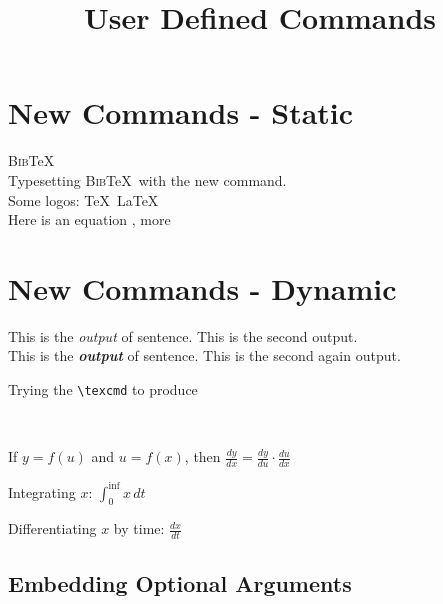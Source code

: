 \documentclass{article}
\title{\bf User Defined Commands}
\date{}
\begin{document}
	\maketitle
	
	\section{New Commands - Static} 
	\newcommand{\bibtex}{\textsc{Bib}\TeX~}
	\bibtex \\
	Typesetting \bibtex with the new command. \\
	
	\noindent
	\newcommand{\texnames}{Some logos: \TeX~\LaTeX}
	\texnames \\
	
	\newcommand{\creq}{
		{}	
	}
	Here is an equation \creq, more \creq
	
	\vspace{0.5cm}
	
	\section{New Commands - Dynamic}
	\newcommand{\sentence}[2]{%
		This is the \textit{#1} of sentence. 
		This is the #2 output.
	}
	\sentence{output}{second} \\
	\sentence{\textbf{output}}{second again}
	
	\newcommand{\kp}[1]{\kant[1-#1]}
	\kp{2}
	
	\newcommand{\texcmd}[1]{
		{
			\color{red!70}{\texttt{\detokenize{#1}}}		
		}
	}
	Trying the \verb|\texcmd| to produce \texcmd{\LaTeX}
	
	\noindent \\
	{\color{blue!50}{\verb|\newcommand{\cmd}{def}|}}
	
	\newcommand{\chain}[3]{
		$
			\frac{d#1}{d#2}	= 
				\frac{d#1}{d#3} \cdot \frac{d#3}{d#2}
		$	
	}
	If $y=f(u)$ and $u=f(x)$, then \chain{y}{x}{u}
	
	\newcommand{\intx}[3]{
		$
			\int_{#3}^{\inf} #2\, d#1 	
		$
	}
	Integrating $x$: \intx{t}{x}{0} %
	

	\newcommand{\dd}[2]{
		\ensuremath{
			\frac{d#1}{d#2}		
		}	
	}
	Differentiating $x$ by time: $\dd{x}{t}$
	
	\subsection{Embedding Optional Arguments}
	
\end{document}
